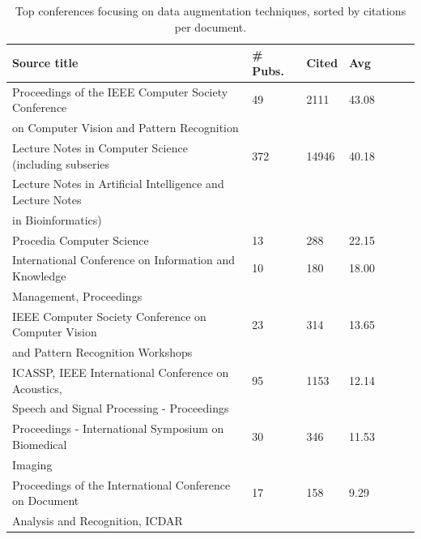 \documentclass[parskip=full]{scrartcl}
\begin{document}
\begin{table}[ht]
    \begin{center}
    \caption{\label{tab:top_conferences}
        Top conferences focusing on data augmentation techniques, sorted by
        citations per document.
    }
    \begin{tabular*}{\textwidth}{@{\extracolsep{\fill}}lllllll@{\extracolsep{\fill}}}
        \toprule
        Source title & \# Pubs. & Cited & Avg \\
        \midrule
        Proceedings of the IEEE Computer Society Conference & 49 & 2111 & 43.08 \\
        \vspace{.2cm}on Computer Vision and Pattern Recognition &&& \\
        Lecture Notes in Computer Science (including subseries & 372 & 14946 & 40.18 \\
        Lecture Notes in Artificial Intelligence and Lecture Notes &&& \\ 
        \vspace{.2cm}in Bioinformatics) &&& \\

        \vspace{.2cm}Procedia Computer Science & 13 & 288 & 22.15 \\

        International Conference on Information and Knowledge & 10 & 180 & 18.00 \\
        \vspace{.2cm}Management, Proceedings &&& \\

        IEEE Computer Society Conference on Computer Vision & 23 & 314 & 13.65 \\
        \vspace{.2cm}and Pattern Recognition Workshops &&& \\

        ICASSP, IEEE International Conference on Acoustics, & 95 & 1153 & 12.14 \\
        \vspace{.2cm}Speech and Signal Processing - Proceedings &&& \\

        Proceedings - International Symposium on Biomedical & 30 & 346 & 11.53 \\
        \vspace{.2cm}Imaging &&& \\

        Proceedings of the International Conference on Document & 17 & 158 & 9.29 \\
        \vspace{.2cm}Analysis and Recognition, ICDAR &&& \\


\end{tabular*}
\end{center}
\end{table}
\end{document}
